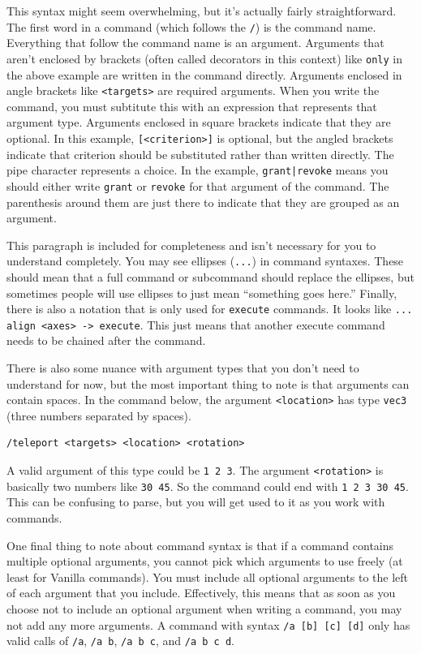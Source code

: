 \documentclass[oneside]{book}
\begin{document}
This syntax might seem overwhelming, but it's actually fairly straightforward. The first word in a command (which follows the \texttt{/}) is the command name. Everything that follow the command name is an argument. Arguments that aren't enclosed by brackets (often called decorators in this context) like \texttt{only} in the above example are written in the command directly. Arguments enclosed in angle brackets like \texttt{<targets>} are required arguments. When you write the command, you must subtitute this with an expression that represents that argument type. Arguments enclosed in square brackets indicate that they are optional. In this example, \texttt{[<criterion>]} is optional, but the angled brackets indicate that criterion should be substituted rather than written directly. The pipe character represents a choice. In the example, \texttt{grant|revoke} means you should either write \texttt{grant} or \texttt{revoke} for that argument of the command. The parenthesis around them are just there to indicate that they are grouped as an argument. 

This paragraph is included for completeness and isn't necessary for you to understand completely. You may see ellipses (\texttt{...}) in command syntaxes. These should mean that a full command or subcommand should replace the ellipses, but sometimes people will use ellipses to just mean ``something goes here.'' Finally, there is also a notation that is only used for \texttt{execute} commands. It looks like \texttt{... align <axes> -> execute}. This just means that another execute command needs to be chained after the command.

There is also some nuance with argument types that you don't need to understand for now, but the most important thing to note is that arguments can contain spaces. In the command below, the argument \texttt{<location>} has type \texttt{vec3} (three numbers separated by spaces).

\begin{verbatim}
/teleport <targets> <location> <rotation>
\end{verbatim}

A valid argument of this type could be \texttt{1 2 3}. The argument \texttt{<rotation>} is basically two numbers like \texttt{30 45}. So the command could end with \texttt{1 2 3 30 45}. This can be confusing to parse, but you will get used to it as you work with commands.

One final thing to note about command syntax is that if a command contains multiple optional arguments, you cannot pick which arguments to use freely (at least for Vanilla commands). You must include all optional arguments to the left of each argument that you include. Effectively, this means that as soon as you choose not to include an optional argument when writing a command, you may not add any more arguments. A command with syntax \texttt{/a [b] [c] [d]} only has valid calls of \texttt{/a}, \texttt{/a b}, \mbox{\texttt{/a b c}}, and \texttt{/a b c d}.
\end{document}
